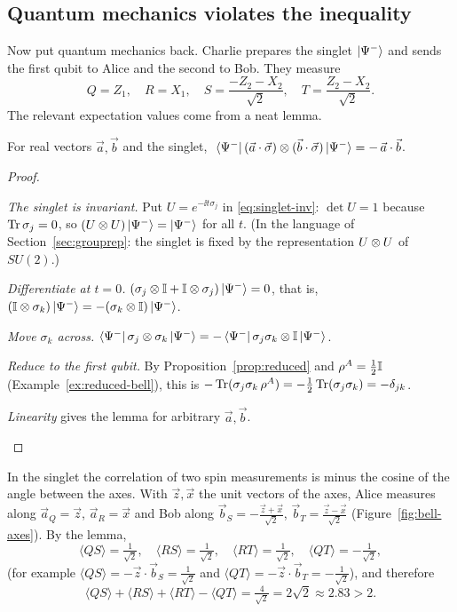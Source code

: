 \subsection{Quantum mechanics violates the inequality}

Now put quantum mechanics back. Charlie prepares the singlet $\left|\Psi^-\right\rangle$ and sends the first qubit to Alice and the second to Bob. They measure
\[
  Q=Z_1,\quad R=X_1,\quad S=\frac{-Z_2-X_2}{\sqrt2},\quad T=\frac{Z_2-X_2}{\sqrt2}.
\]
The relevant expectation values come from a neat lemma.

\begin{lemma}\label{lem:singlet-corr}
  For real vectors $\vec a,\vec b$ and the singlet, $\ \left\langle\Psi^-\right|(\vec a\cdot\vec\sigma)\otimes(\vec b\cdot\vec\sigma)\left|\Psi^-\right\rangle=-\,\vec a\cdot\vec b$.
\end{lemma}
\begin{proof}
  \begin{steps}
    \item \emph{The singlet is invariant.} Put $U=e^{-\ii t\sigma_j}$ in \eqref{eq:singlet-inv}: $\det U=1$ because $\operatorname{Tr}\sigma_j=0$, so $(U\otimes U)\left|\Psi^-\right\rangle=\left|\Psi^-\right\rangle$ for all $t$. (In the language of Section~\ref{sec:grouprep}: the singlet is fixed by the representation $U\otimes U$ of $SU(2)$.)
    \item \emph{Differentiate at $t=0$.} $(\sigma_j\otimes\mathbb{I}+\mathbb{I}\otimes\sigma_j)\left|\Psi^-\right\rangle=0$, that is, $(\mathbb{I}\otimes\sigma_k)\left|\Psi^-\right\rangle=-(\sigma_k\otimes\mathbb{I})\left|\Psi^-\right\rangle$.
    \item \emph{Move $\sigma_k$ across.} $\left\langle\Psi^-\right|\sigma_j\otimes\sigma_k\left|\Psi^-\right\rangle=-\left\langle\Psi^-\right|\sigma_j\sigma_k\otimes\mathbb{I}\left|\Psi^-\right\rangle$.
    \item \emph{Reduce to the first qubit.} By Proposition~\ref{prop:reduced} and $\rho^A=\tfrac12\mathbb{I}$ (Example~\ref{ex:reduced-bell}), this is $-\operatorname{Tr}(\sigma_j\sigma_k\,\rho^A)=-\tfrac12\operatorname{Tr}(\sigma_j\sigma_k)=-\delta_{jk}$.
    \item \emph{Linearity} gives the lemma for arbitrary $\vec a,\vec b$. \qedhere
  \end{steps}
\end{proof}

In the singlet the correlation of two spin measurements is minus the cosine of the angle between the axes. With $\vec z,\vec x$ the unit vectors of the axes, Alice measures along $\vec a_Q=\vec z$, $\vec a_R=\vec x$ and Bob along
$\vec b_S=-\frac{\vec z+\vec x}{\sqrt2}$, $\vec b_T=\frac{\vec z-\vec x}{\sqrt2}$ (Figure~\ref{fig:bell-axes}). By the lemma,
\[
  \langle QS\rangle=\tfrac1{\sqrt2},\quad \langle RS\rangle=\tfrac1{\sqrt2},\quad \langle RT\rangle=\tfrac1{\sqrt2},\quad \langle QT\rangle=-\tfrac1{\sqrt2},
\]
(for example $\langle QS\rangle=-\vec z\cdot\vec b_S=\frac1{\sqrt2}$ and $\langle QT\rangle=-\vec z\cdot\vec b_T=-\frac1{\sqrt2}$), and therefore
\[
  \langle QS\rangle+\langle RS\rangle+\langle RT\rangle-\langle QT\rangle=\tfrac4{\sqrt2}=2\sqrt2\approx2.83>2 .
\]

